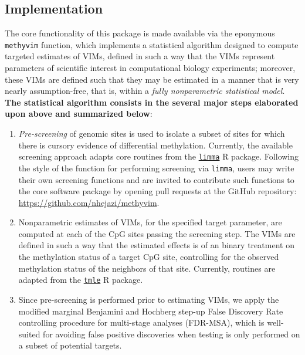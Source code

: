 \documentclass[9pt,a4paper,]{extarticle}
\theoremstyle{definition}
\theoremstyle{definition}
\theoremstyle{definition}
\theoremstyle{remark}
\begin{document}
\hypertarget{implementation}{%
\subsection{Implementation}\label{implementation}}

The core functionality of this package is made available via the eponymous
\texttt{methyvim} function, which implements a statistical algorithm designed to
compute targeted estimates of VIMs, defined in such a way that the VIMs
represent parameters of scientific interest in computational biology
experiments; moreover, these VIMs are defined such that they may be estimated in
a manner that is very nearly assumption-free, that is, within a \emph{fully
nonparametric statistical model}. \textbf{The statistical algorithm consists in the
several major steps elaborated upon above and summarized below}:

\begin{enumerate}
\def\labelenumi{\arabic{enumi}.}
\item
  \emph{Pre-screening} of genomic sites is used to isolate a subset of sites for
  which there is cursory evidence of differential methylation. Currently, the
  available screening approach adapts core routines from the
  \href{http://bioconductor.org/packages/limma}{\texttt{limma}} R package. Following the
  style of the function for performing screening via \texttt{limma}, users may write
  their own screening functions and are invited to contribute such functions to
  the core software package by opening pull requests at the GitHub repository:
  \url{https://github.com/nhejazi/methyvim}.
\item
  Nonparametric estimates of VIMs, for the specified target parameter, are
  computed at each of the CpG sites passing the screening step. The VIMs are
  defined in such a way that the estimated effects is of an binary treatment on
  the methylation status of a target CpG site, controlling for the observed
  methylation status of the neighbors of that site. Currently, routines are
  adapted from the \href{https://CRAN.R-project.org/package=tmle}{\texttt{tmle}} R package.
\item
  Since pre-screening is performed prior to estimating VIMs, we apply the
  modified marginal Benjamini and Hochberg step-up False Discovery Rate
  controlling procedure for multi-stage analyses (FDR-MSA), which is
  well-suited for avoiding false positive discoveries when testing is only
  performed on a subset of potential targets.
\end{enumerate}
\end{document}
